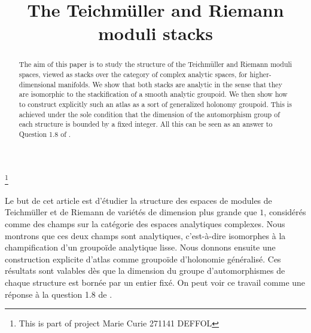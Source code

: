 \documentclass[JEP,XML,SOM,Unicode]{cedram}
\theoremstyle{plain}
\theoremstyle{definition}
\theoremstyle{remark}
\numberwithin{equation}{section}
\begin{document}
\frontmatter

\title{The Teichmüller and Riemann moduli stacks}

\author[\initial{L.} \lastname{Meersseman}]{ }
\address{LAREMA, Université d'Angers\\
F-49045 Angers Cedex, France}

\thanks{This is part of project Marie Curie 271141 DEFFOL}




\begin{abstract}
The aim of this paper is to study the structure of the Teichmüller and \hbox{Riemann} moduli spaces, viewed as stacks over the category of complex analytic spaces, for higher-dimensional manifolds. We show that both stacks are analytic in the sense that they are isomorphic to the stackification of a smooth analytic groupoid. We then show how to construct explicitly such an atlas as a sort of generalized holonomy groupoid. This is achieved under the sole condition that the dimension of the automorphism group of each structure is bounded by a fixed integer. All this can be seen as an answer to Question 1.8 of \cite{VerbitskySurvey}.
\end{abstract}



\begin{altabstract}
Le but de cet article est d'étudier la structure des espaces de modules de Teichmüller et de Riemann de variétés de dimension plus grande que $1$, considérés comme des champs sur la catégorie des espaces analytiques complexes. Nous montrons que ces deux champs sont analytiques, c'est-à-dire isomorphes à la champification d'un groupoïde analytique lisse. Nous donnons ensuite une construction explicite d'atlas comme groupoïde d'holonomie généralisé. Ces résultats sont valables dès que la dimension du groupe d'automorphismes de chaque structure est bornée par un entier fixé. On peut voir ce travail comme une réponse à la question 1.8 de \cite{VerbitskySurvey}.
\end{altabstract}
\end{document}
